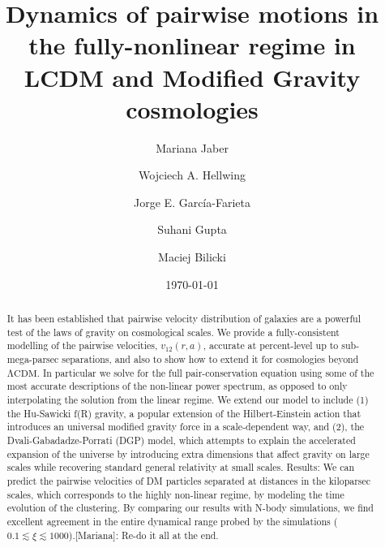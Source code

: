 \documentclass[%
 reprint,
groupedaddress,
nofootinbib,
nobibnotes,
 amsmath,amssymb,
 aps,
]{revtex4-2}
\newcommand{\pairvel}{$v_{12}(r,a)$}
\newcommand{\lcdm}{$\mathrm{\Lambda CDM}$}
\newcommand{\<}{\langle}
\renewcommand{\>}{\rangle}
\newcommand{\MJ}[1]{\textcolor{WildStrawberry}{[Mariana]: #1}}
\newcommand{\MJall}[1]{\textcolor{WildStrawberry}{[ATTENTION]: #1}}
\begin{document}
 

\title{Dynamics of pairwise motions in the fully-nonlinear regime in LCDM and Modified Gravity cosmologies}

\author{Mariana Jaber}
\author{Wojciech A. Hellwing}
\author{Jorge E. Garc\'ia-Farieta}
\author{Suhani Gupta}
\author{Maciej Bilicki}

\date{\today}

\begin{abstract}
It has been established that pairwise velocity distribution of galaxies are a powerful test of the laws of gravity on cosmological scales.
We provide a fully-consistent modelling of the pairwise velocities, \pairvel{}, accurate at percent-level up to sub-mega-parsec separations, and also to show how to extend it for cosmologies beyond \lcdm.   
%
In particular we solve for the full pair-conservation equation using some of the most accurate descriptions of the non-linear power spectrum,  as opposed to only  interpolating the solution from the linear regime.  
We extend our model to include (1) the Hu-Sawicki f(R) gravity, a popular extension of the Hilbert-Einstein action that introduces an universal modified gravity force in a scale-dependent way, and (2), the  Dvali-Gabadadze-Porrati (DGP) model, which attempts to explain the accelerated expansion of the universe by introducing extra dimensions that affect gravity on large scales while recovering standard general relativity at small scales.
Results: We can predict the pairwise velocities of DM particles separated at distances in the kiloparsec scales, which corresponds to the highly non-linear regime, by modeling the time evolution of the clustering. By comparing our results with N-body simulations, we find excellent agreement in the entire dynamical range probed by the simulations ($0.1 \lesssim \xi \lesssim 1000$).\MJ{Re-do it all at the end.} 


\end{abstract}
\end{document}
